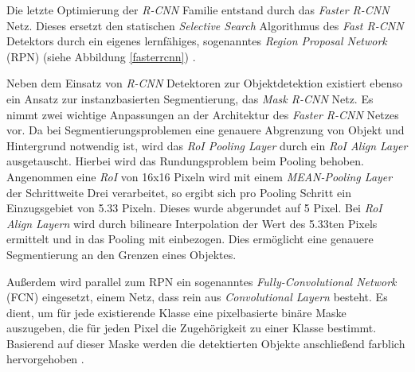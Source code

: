 Die letzte Optimierung der \textit{R-CNN} Familie entstand durch das \textit{Faster R-CNN} Netz. Dieses ersetzt den statischen \textit{Selective Search} Algorithmus des \textit{Fast R-CNN} Detektors durch ein eigenes lernfähiges, sogenanntes \textit{Region Proposal Network} (RPN)  (siehe Abbildung \ref{fasterrcnn}) \cite{ShaoqingRenKaimingHeRossGirshickJianSun.2016}.

Neben dem Einsatz von \textit{R-CNN} Detektoren zur Objektdetektion existiert ebenso ein Ansatz zur instanzbasierten Segmentierung, das \textit{Mask R-CNN} Netz. Es nimmt zwei wichtige Anpassungen an der Architektur des \textit{Faster R-CNN} Netzes vor. Da bei Segmentierungsproblemen eine genauere Abgrenzung von Objekt und Hintergrund notwendig ist, wird das \textit{RoI Pooling Layer} durch ein \textit{RoI Align Layer} ausgetauscht. Hierbei wird das Rundungsproblem beim Pooling behoben. Angenommen eine \textit{RoI} von 16x16 Pixeln wird mit einem \textit{MEAN-Pooling Layer} der Schrittweite Drei verarbeitet, so ergibt sich pro Pooling Schritt ein Einzugsgebiet von 5.33 Pixeln. Dieses wurde abgerundet auf 5 Pixel. Bei \textit{RoI Align Layern} wird durch bilineare Interpolation der Wert des 5.33ten Pixels ermittelt und in das Pooling mit einbezogen. Dies ermöglicht eine genauere Segmentierung an den Grenzen eines Objektes.

Außerdem wird parallel zum RPN ein sogenanntes \textit{Fully-Convolutional Network} (FCN) eingesetzt, einem Netz, dass rein aus \textit{Convolutional Layern} besteht. Es dient, um für jede existierende Klasse eine pixelbasierte binäre Maske auszugeben, die für jeden Pixel die Zugehörigkeit zu einer Klasse bestimmt. Basierend auf dieser Maske werden die detektierten Objekte anschließend farblich hervorgehoben \cite{KaimingHeGeorgiaGkioxariPiotrDollarRossGirshick.20180224}.